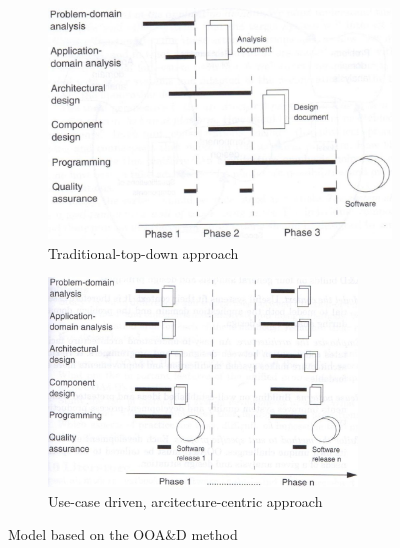 \begin{figure}[H]
	\centering
	\begin{subfigure}[b]{0.48\textwidth}
		\includegraphics[width=\textwidth]{billeder/SUModel1.jpg}
		\caption{Traditional-top-down approach \citep[p.~16]{Rod-Aalborg}}
		\label{fig:SUModel1}
	\end{subfigure}
	\quad
	\begin{subfigure}[b]{0.48\textwidth}
		\includegraphics[width=0.9\textwidth]{billeder/SUModel2.jpg}
		\caption{Use-case driven, arcitecture-centric approach \citep[p.~17]{Rod-Aalborg}}
		\label{fig:SUModel2}
	\end{subfigure}
	\caption{Model based on the OOA\&D method}\label{fig:SUModels}
\end{figure}

